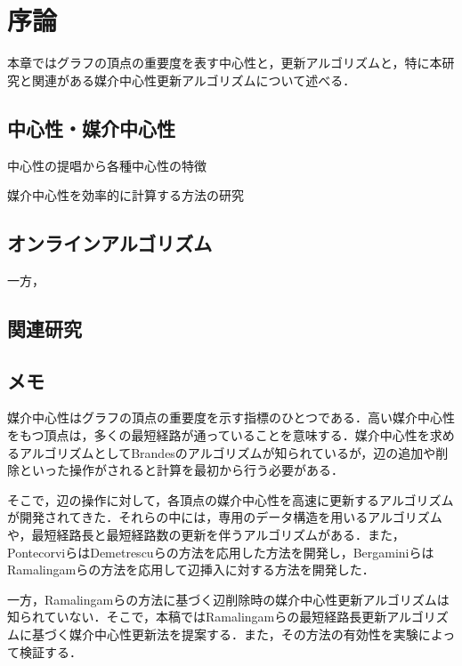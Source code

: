 \chapter{序論}

本章ではグラフの頂点の重要度を表す中心性と，更新アルゴリズムと，特に本研究と関連がある媒介中心性更新アルゴリズムについて述べる．

\section{中心性・媒介中心性}

中心性の提唱から各種中心性の特徴

媒介中心性を効率的に計算する方法の研究

\section{オンラインアルゴリズム}

一方，

\section{関連研究}

\section{メモ}

媒介中心性\cite{Freeman1977}はグラフの頂点の重要度を示す指標のひとつである．高い媒介中心性をもつ頂点は，多くの最短経路が通っていることを意味する．媒介中心性を求めるアルゴリズムとしてBrandesのアルゴリズム\cite{Brandes2001}が知られているが，辺の追加や削除といった操作がされると計算を最初から行う必要がある．

そこで，辺の操作に対して，各頂点の媒介中心性を高速に更新するアルゴリズムが開発されてきた．それらの中には，専用のデータ構造を用いるアルゴリズム\cite{Lee2012,Hayashi2015}や，最短経路長と最短経路数の更新を伴うアルゴリズム\cite{Pontecorvi2015,Bergamini2017}がある．また，PontecorviらはDemetrescuらの方法\cite{Demetrescu2003}を応用した方法を開発し\cite{Pontecorvi2015}，BergaminiらはRamalingamらの方法\cite{Ramalingam1996}を応用して辺挿入に対する方法を開発した\cite{Bergamini2017}．

一方，Ramalingamらの方法に基づく辺削除時の媒介中心性更新アルゴリズムは知られていない．そこで，本稿ではRamalingamらの最短経路長更新アルゴリズムに基づく媒介中心性更新法を提案する．また，その方法の有効性を実験によって検証する．


